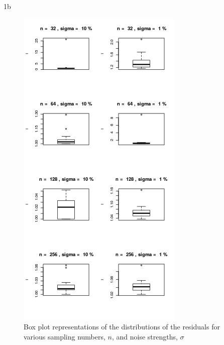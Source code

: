 \documentclass[11pt]{article}
\begin{document}
\begin{homeworkProblem}
\begin{homeworkSection}{1b}
        \begin{figure}[!ht]
            \begin{centering}
                \includegraphics[scale=1]{hw8_1b_Rdist.png}

                \caption{Box plot representations of the distributions of the
                residuals for various sampling numbers, $n$, and noise
            strengths, $\sigma$}

            \end{centering}
        \end{figure}

        \begin{figure}[!ht]
            

\end{figure}
\end{homeworkSection}
\end{homeworkProblem}
\end{document}
